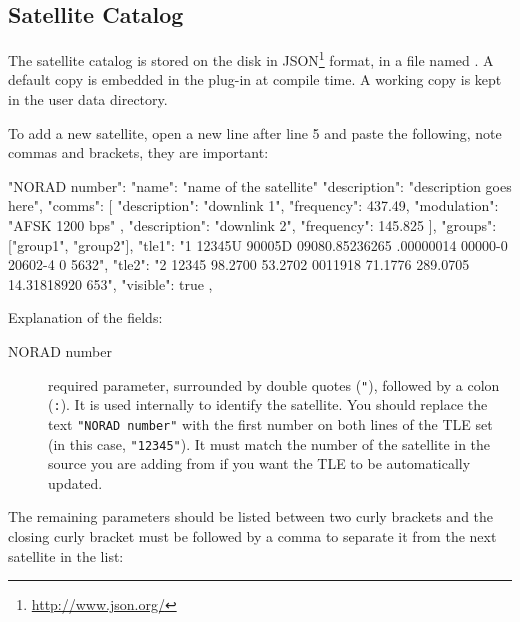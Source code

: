 \subsection{Satellite Catalog}
\label{sec:plugins:Satellites:catalog}



The satellite catalog is stored on the disk in JSON\footnote{\url{http://www.json.org/}}
format, in a file named . A default copy is embedded in the
plug-in at compile time. A working copy is kept in the user data directory.


To add a new satellite, open a new line after line 5 and paste the following, note commas and brackets, they are important:
\begin{configfile}[\scriptsize]
"NORAD number": 
{
  "name": "name of the satellite"
  "description": "description goes here",
  "comms": [
     {
  	"description": "downlink 1",
  	"frequency": 437.49,
  	"modulation": "AFSK 1200 bps"
     },
     {
  	"description": "downlink 2",
  	"frequency": 145.825
     }
              ],
  "groups": ["group1", "group2"],
  "tle1": "1 12345U 90005D   09080.85236265  .00000014  00000-0  20602-4 0  5632",
  "tle2": "2 12345 98.2700  53.2702 0011918  71.1776 289.0705 14.31818920   653",
  "visible": true
},
\end{configfile}
Explanation of the fields:

\begin{description}
\item[NORAD number]  required parameter, surrounded by double quotes (\texttt{"}),
followed by a colon (\texttt{:}). It is used internally to identify the
satellite. You should replace the text \texttt{"NORAD number"} with the first
number on both lines of the TLE set (in this case, \texttt{"12345"}). It must
match the number of the satellite in the source you are adding from if
you want the TLE to be automatically updated.
\end{description}
The remaining parameters should be listed between two curly brackets and the closing curly bracket must be followed by a comma to separate it from the next satellite in the list:

